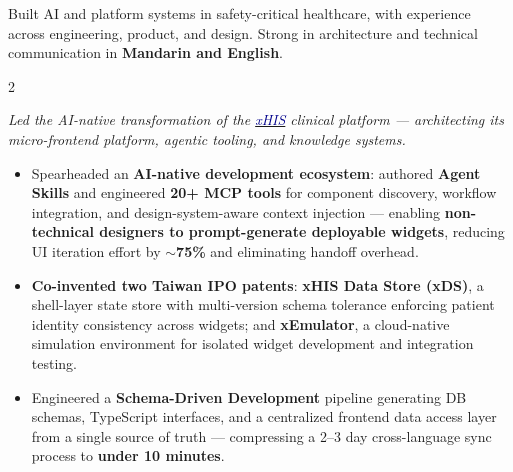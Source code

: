 \documentclass[10pt,a4paper,ragged2e,withhyper]{altacv}
\begin{document}



\makecvheader

\small Built AI and platform systems in safety-critical healthcare, with experience across engineering, product, and design. Strong in architecture and technical communication in \textbf{Mandarin and English}.

\smallskip
{}

\begin{paracol}{2}

\textit{Led the AI-native transformation of the \href{https://aics.asus.com/xhis-en/}{\textcolor{DarkBlue}{xHIS}} clinical platform — architecting its micro-frontend platform, agentic tooling, and knowledge systems.}
\begin{itemize}

  \item Spearheaded an \textbf{AI-native development ecosystem}: authored \textbf{Agent Skills} and engineered \textbf{20+ MCP tools} for component discovery, workflow integration, and design-system-aware context injection — enabling \textbf{non-technical designers to prompt-generate deployable widgets}, reducing UI iteration effort by \textbf{$\sim$75\%} and eliminating handoff overhead.

  \item \textbf{Co-invented two Taiwan IPO patents}: \textbf{xHIS Data Store (xDS)}, a shell-layer state store with multi-version schema tolerance enforcing patient identity consistency across widgets; and \textbf{xEmulator}, a cloud-native simulation environment for isolated widget development and integration testing.

  \item Engineered a \textbf{Schema-Driven Development} pipeline generating DB schemas, TypeScript interfaces, and a centralized frontend data access layer from a single source of truth — compressing a 2–3 day cross-language sync process to \textbf{under 10 minutes}.


\end{itemize}
\end{paracol}
\end{document}
